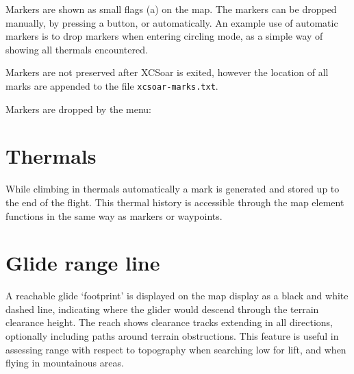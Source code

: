 Markers are shown as small flags (a) on the map.  The markers can be dropped
manually, by pressing a button, or automatically.  An example use of
automatic markers is to drop markers when entering circling mode, as a
simple way of showing all thermals encountered.

Markers are not preserved after XCSoar is exited, however the location
of all marks are appended to the file \verb|xcsoar-marks.txt|.

Markers are dropped by the menu: 
\begin{quote}
\blink{}
\end{quote}

\section{Thermals}

While climbing in thermals automatically a mark is generated and stored up 
to the end of the flight. This thermal history is accessible through the map 
element functions in the same way as markers or waypoints.
\\

\section{Glide range line}\label{sec:reach}

A reachable glide `footprint' is displayed on the map display as a
black and white dashed line, indicating where the glider would descend
through the terrain clearance height.  The reach shows clearance
tracks extending in all directions, optionally including paths around
terrain obstructions.  This feature is useful in assessing range with
respect to topography when searching low for lift, and when flying in
mountainous areas.

